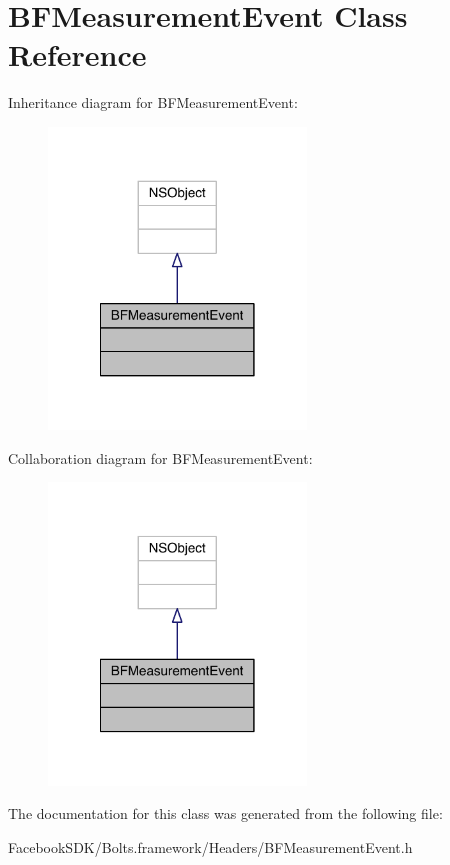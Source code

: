 \hypertarget{interface_b_f_measurement_event}{\section{B\-F\-Measurement\-Event Class Reference}
\label{interface_b_f_measurement_event}
}


Inheritance diagram for B\-F\-Measurement\-Event\-:
\nopagebreak
\begin{figure}[H]
\begin{center}
\leavevmode
\includegraphics[width=194pt]{interface_b_f_measurement_event__inherit__graph}
\end{center}
\end{figure}


Collaboration diagram for B\-F\-Measurement\-Event\-:
\nopagebreak
\begin{figure}[H]
\begin{center}
\leavevmode
\includegraphics[width=194pt]{interface_b_f_measurement_event__coll__graph}
\end{center}
\end{figure}


The documentation for this class was generated from the following file\-:\begin{DoxyCompactItemize}
\item 
Facebook\-S\-D\-K/\-Bolts.\-framework/\-Headers/B\-F\-Measurement\-Event.\-h\end{DoxyCompactItemize}
